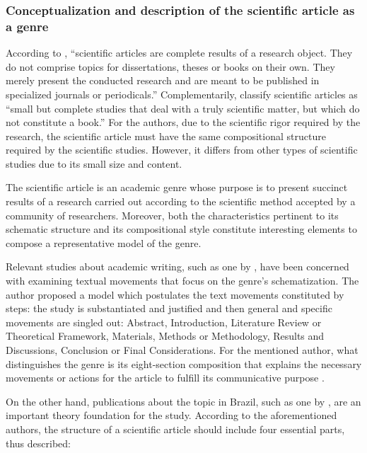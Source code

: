 \documentclass[english]{textolivre}
\begin{document}
\subsubsection{Conceptualization and description of the scientific article as a genre}\label{sec-modelo}
According to \textcite[p. 71]{marcantonio_elaboracao_1993}, “scientific articles are complete results of a research object. They do not comprise topics for dissertations, theses or books on their own. They merely present the conducted research and are meant to be published in specialized journals or periodicals.” Complementarily, \textcite[p. 84]{marconi_fundamentos_2010} classify scientific articles as “small but complete studies that deal with a truly scientific matter, but which do not constitute a book.” For the authors, due to the scientific rigor required by the research, the scientific article must have the same compositional structure required by the scientific studies. However, it differs from other types of scientific studies due to its small size and content.

The scientific article is an academic genre whose purpose is to present succinct results of a research carried out according to the scientific method accepted by a community of researchers. Moreover, both the characteristics pertinent to its schematic structure and its compositional style constitute interesting elements to compose a representative model of the genre.

Relevant studies about academic writing, such as one by \textcite{swales_genre_1990}, have been concerned with examining textual movements that focus on the genre’s schematization. The author proposed a model which postulates the text movements constituted by steps: the study is substantiated and justified and then general and specific movements are singled out: Abstract, Introduction, Literature Review or Theoretical Framework, Materials, Methods or Methodology, Results and Discussions, Conclusion or Final Considerations. For the mentioned author, what distinguishes the genre is its eight-section composition that explains the necessary movements or actions for the article to fulfill its communicative purpose \cite{swales_genre_1990}.

On the other hand, publications about the topic in Brazil, such as one by \textcite{marconi_fundamentos_2010}, are an important theory foundation for the study. According to the aforementioned authors, the structure of a scientific article should include four essential parts, thus described:
\end{document}
